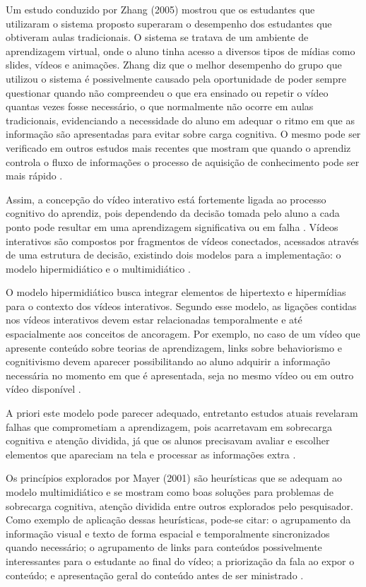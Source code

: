 Um estudo conduzido por Zhang (2005) mostrou que os estudantes que utilizaram o sistema proposto superaram o desempenho dos estudantes que obtiveram aulas tradicionais. O sistema se tratava de um ambiente de aprendizagem virtual, onde o aluno tinha acesso a diversos tipos de mídias como slides, vídeos e animações. Zhang diz que o melhor desempenho do grupo que utilizou o sistema é possivelmente causado pela oportunidade de poder sempre questionar quando não compreendeu o que era ensinado ou repetir o vídeo quantas vezes fosse necessário, o que normalmente não ocorre em aulas tradicionais, evidenciando a necessidade do aluno em adequar o ritmo em que as informação são apresentadas para evitar sobre carga cognitiva. O mesmo pode ser verificado em outros estudos mais recentes que mostram que quando o aprendiz controla o fluxo de informações o processo de aquisição de conhecimento pode ser mais rápido \cite{schwan2004, mayer2001, zhang2005}.

Assim, a concepção do vídeo interativo está fortemente ligada ao processo cognitivo do aprendiz, pois dependendo da decisão tomada pelo aluno a cada ponto pode resultar em uma aprendizagem significativa ou em falha \cite{moreno2000}. Vídeos interativos são compostos por fragmentos de vídeos conectados, acessados através de uma estrutura de decisão, existindo dois modelos para a implementação: o modelo hipermidiático e o multimidiático \cite{wetzel1994}.

O modelo hipermidiático busca integrar elementos de hipertexto e hipermídias para o contexto dos vídeos interativos. Segundo esse modelo, as ligações contidas nos vídeos interativos devem estar relacionadas temporalmente e até espacialmente aos conceitos de ancoragem. Por exemplo, no caso de um vídeo que apresente conteúdo sobre teorias de aprendizagem, links sobre behaviorismo e cognitivismo devem aparecer possibilitando ao aluno adquirir a informação necessária no momento em que é apresentada, seja no mesmo vídeo ou em outro vídeo disponível \cite{wetzel1994}.

A priori este modelo pode parecer adequado, entretanto estudos atuais revelaram falhas que comprometiam a aprendizagem, pois acarretavam em sobrecarga cognitiva e atenção dividida, já que os alunos precisavam avaliar e escolher elementos que apareciam na tela e processar as informações extra \cite{zhang2005, moreno2000}.

Os princípios explorados por Mayer (2001) são heurísticas que se adequam ao modelo multimidiático e se mostram como boas soluções para problemas de sobrecarga cognitiva, atenção dividida entre outros explorados pelo pesquisador. Como exemplo de aplicação dessas heurísticas, pode-se citar: o agrupamento da informação visual e texto de forma espacial e temporalmente sincronizados quando necessário; o agrupamento de links para conteúdos possivelmente interessantes para o estudante ao final do vídeo; a priorização da fala ao expor o conteúdo; e apresentação geral do conteúdo antes de ser ministrado \cite{mayer2001}.

